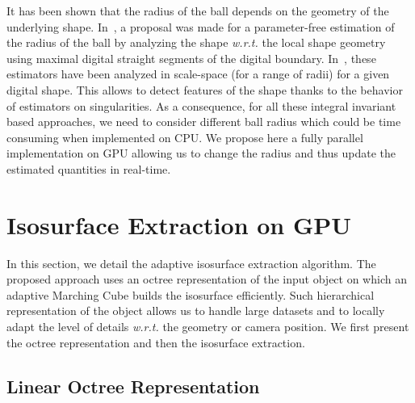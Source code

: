 \documentclass{llncs}
\newcommand{\wrt}{\emph{w.r.t.}\xspace}
\begin{document}
It has been shown that the radius of the ball depends on the geometry of the
underlying shape. In~\cite{DGCI2014}, a proposal was made for a parameter-free
estimation of the radius of the ball by analyzing the shape \wrt the local shape
geometry using maximal digital straight segments of the digital boundary.
In~\cite{SMI2015}, these estimators have been analyzed in scale-space (for a
range of radii) for a given digital shape. This allows to detect features of
the shape thanks to the behavior of estimators on singularities.
As a consequence, for all these integral invariant based approaches, we need to
consider different ball radius which could be time consuming when implemented on
CPU. We propose here a fully parallel implementation on GPU allowing us to
change the radius and thus update the estimated quantities in real-time.

\section{Isosurface Extraction on GPU}
\label{sec:isos-extr-gpu}

In this section, we detail the adaptive isosurface extraction
algorithm.
The proposed approach uses an octree representation of the input object
on which an adaptive Marching Cube builds the isosurface efficiently.
Such
hierarchical representation of the object allows us
to handle large datasets and to locally adapt the level of details
\wrt the geometry or camera position. We first present the
octree representation and then the isosurface extraction.

\subsection{Linear Octree Representation}
\end{document}
